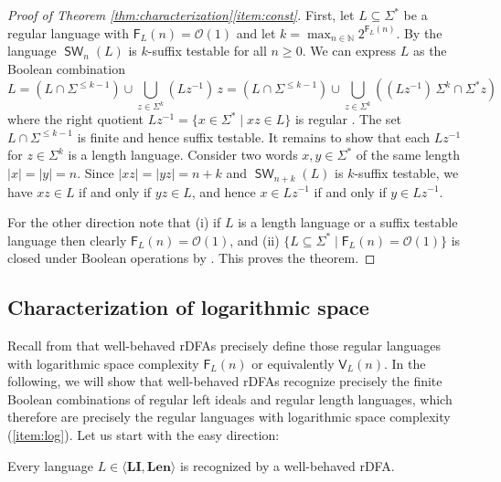 \documentclass{article}\usepackage[a4paper,margin=20mm]{geometry}
\newcommand{\N}{\mathbb{N}}
\renewcommand{\O}{\mathcal{O}}
\newcommand{\F}{\mathsf{F}}
\newcommand{\V}{\mathsf{V}}
\DeclareMathOperator{\SW}{\mathsf{SW}}
\newcommand{\Len}{\mathbf{Len}}
\newcommand{\LI}{\mathbf{LI}}
\renewcommand{\geq}{\geqslant}
\renewcommand{\leq}{\leqslant}
\renewcommand{\ge}{\geq}
\renewcommand{\le}{\leq}
\begin{document}
\begin{proof}[Proof of Theorem \ref{thm:characterization}\ref{item:const}]
	First, let $L \subseteq \Sigma^*$ be a regular language with $\F_L(n) = \O(1)$
	and let $k = \max_{n \in \N} 2^{\F_L(n)}$.
	By  the language $\SW_n(L)$ is $k$-suffix testable for all $n \ge 0$.
	We can express $L$ as the Boolean combination
	\[
		L = (L \cap \Sigma^{\le k-1}) \cup \bigcup_{z \in \Sigma^k} (Lz^{-1}) \, z = (L \cap \Sigma^{\le k-1}) \cup \bigcup_{z \in \Sigma^k} ((Lz^{-1}) \, \Sigma^k \cap \Sigma^* z)
	\]
	where the right quotient $Lz^{-1} = \{ x \in \Sigma^* \mid xz \in L \}$ is regular \cite[Chapter~3,~Example~5.7]{Berstel79}.
	The set $L \cap \Sigma^{\le k-1}$ is finite and hence suffix testable. 
	It remains to show that each $Lz^{-1}$ for $z \in \Sigma^k$  is a length language.
	Consider two words $x,y \in \Sigma^*$ of the same length $|x|=|y|=n$.
	Since $|xz|=|yz| = n+k$ and $\SW_{n+k}(L)$ is $k$-suffix testable, we have $xz \in L$ if and only if $yz \in L$,
	and hence $x \in Lz^{-1}$ if and only if $y \in Lz^{-1}$.
			
	For the other direction note that
	(i) if $L$ is a length language or a suffix testable language then clearly
	$\F_L(n) = \O(1)$, and
	(ii) $\{ L \subseteq \Sigma^* \mid \F_L(n) = \O(1) \}$ is closed under Boolean operations by .
	This proves the theorem.
\end{proof}

\subsection{Characterization of logarithmic space}

\label{sec:char-log}

Recall from  that well-behaved \mbox{rDFAs} precisely define those regular languages
with logarithmic space complexity $\F_L(n)$ or equivalently $\V_L(n)$.
In the following, we will show that
well-behaved rDFAs recognize precisely the finite Boolean combinations of
regular left ideals and regular length languages,
which therefore are precisely the regular languages with logarithmic space complexity (\ref{item:log}).
Let us start with the easy direction:

\begin{proposition}
	Every language $L \in \langle \LI, \Len \rangle$ is recognized by a well-behaved rDFA.
\end{proposition}
\end{document}
